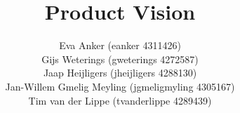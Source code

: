 \documentclass{tudelft-report}
\begin{document}
\frontmatter

\title[For MoodCat]{Product Vision}
\author{\small Eva Anker (eanker 4311426)\\
		Gijs Weterings (gweterings 4272587)\\
		Jaap Heijligers (jheijligers 4288130)\\
		Jan-Willem Gmelig Meyling (jgmeligmyling 4305167)\\
		Tim van der Lippe (tvanderlippe 4289439)}
\makecover



\tableofcontents

%


\mainmatter


	
\appendix

%


\end{document}
